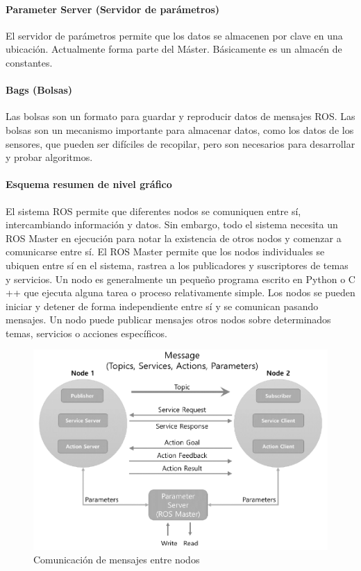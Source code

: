             \paragraph{ Parameter Server (Servidor de parámetros)}
                 El servidor de parámetros permite que los datos se almacenen por clave en una ubicación. Actualmente forma parte del Máster. Básicamente es un almacén de constantes.

               
            \paragraph{Bags (Bolsas)}
            Las bolsas son un formato para guardar y reproducir datos de mensajes ROS. Las bolsas son un mecanismo importante para almacenar datos, como los datos de los sensores, que pueden ser difíciles de recopilar, pero son necesarios para desarrollar y probar algoritmos.
               \newpage
               
            \paragraph{Esquema resumen de nivel gráfico}
                El sistema ROS permite que diferentes nodos se comuniquen entre sí, intercambiando información y datos. Sin embargo, todo el sistema necesita un ROS Master en ejecución para notar la existencia de otros nodos y comenzar a comunicarse entre sí. El ROS Master permite que los nodos individuales se ubiquen entre sí en el sistema, rastrea a los publicadores y suscriptores de temas y servicios. Un nodo es generalmente un pequeño programa escrito en Python o C ++ que ejecuta alguna tarea o proceso relativamente simple. Los nodos se pueden iniciar y detener de forma independiente entre sí y se comunican pasando mensajes. Un nodo puede publicar mensajes otros nodos sobre determinados temas, servicios o acciones específicos. 
                
                
                
            \begin{figure}[htb]
                \centering
                \includegraphics[width=1.0\linewidth]{Main/Chapter3/Images3/n_s_a_14.PNG}
                \caption{Comunicación de mensajes entre nodos \cite{ROS_BOOK_1}}
                \label{f:Cap3_conceptos_14}
            \end{figure}   

